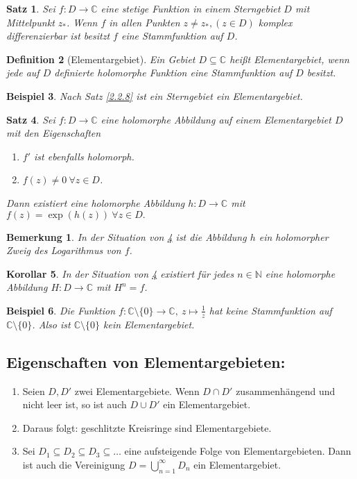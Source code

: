 \documentclass[a4paper,12pt]{book}
\theoremstyle{newthm}
\newtheorem{thm}{Satz}[section]
\newtheorem{cor}[thm]{Korollar}
\theoremstyle{newdef}
\newtheorem{defn}[thm]{Definition}
\theoremstyle{newrem}
\newtheorem{exmp}[thm]{Beispiel}
\newtheorem*{rem}{Bemerkung}
\newcommand{\N}{\mathbb{N}}
\newcommand{\C}{\mathbb{C}}
\begin{document}
		\begin{thm}
			Sei $ f: D \to \C $ eine stetige Funktion in einem Sterngebiet $D$ mit Mittelpunkt $ z_* $. Wenn $f$ in allen Punkten $ z \neq z_*, (z \in D) $ komplex differenzierbar ist besitzt $f$ eine Stammfunktion auf $D$.
		\end{thm}
		\begin{defn}[Elementargebiet]
			Ein Gebiet $ D \subseteq \C $ heißt \emph{Elementargebiet}, wenn jede auf $D$ definierte holomorphe Funktion eine Stammfunktion auf $D$ besitzt.
		\end{defn}
		
		\begin{exmp}
			Nach Satz \ref{2.2.8} ist ein Sterngebiet ein Elementargebiet.
		\end{exmp}
		
		\begin{thm}\label{2.2.14}
			Sei $ f: D \to \C $ eine holomorphe Abbildung auf einem Elementargebiet $D$ mit den Eigenschaften
			\begin{enumerate}[label={\roman*})]
				\item $f'$ ist ebenfalls holomorph.
				\item $ f(z) \neq 0 \ \forall z \in D $.
			\end{enumerate}
			Dann existiert eine holomorphe Abbildung $ h: D \to \C $ mit $ f(z) = \exp(h(z)) \ \forall z \in D. $
		\end{thm}
		
		\begin{rem}
			In der Situation von \ref{2.2.14} ist die Abbildung $h$ ein holomorpher Zweig des Logarithmus von $f$.
		\end{rem}
		
		\begin{cor}
			In der Situation von \ref{2.2.14} existiert für jedes $ n \in \N $ eine holomorphe Abbildung $ H: D \to \C $ mit $ H^n = f $.
		\end{cor}
		
		\begin{exmp}
			Die Funktion $ f: \C \setminus\{0\} \to \C,\ z \mapsto \frac{1}{z} $ hat keine Stammfunktion auf $ \C \setminus\{0\} $. Also ist $ \C\setminus\{0\} $ kein Elementargebiet.
		\end{exmp}
		
		\subsection*{Eigenschaften von Elementargebieten:}
		\begin{enumerate}
			\item Seien $ D,D' $ zwei Elementargebiete. Wenn $ D \cap D' $ zusammenhängend und nicht leer ist, so ist auch $ D \cup D' $ ein Elementargebiet.
			\item Daraus folgt: geschlitzte Kreisringe sind Elementargebiete.
			\item Sei $ D_1 \subseteq D_2 \subseteq D_3 \subseteq \dots $ eine aufsteigende Folge von Elementargebieten. Dann ist auch die Vereinigung $ D = \bigcup_{n=1}^\infty D_n $ ein Elementargebiet.
		\end{enumerate}
		
\end{document}
